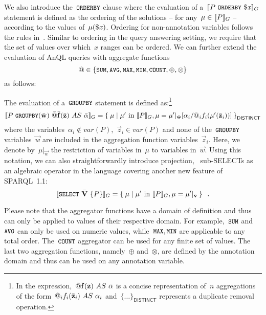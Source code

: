 \nd We also introduce the~$\texttt{{\small ORDERBY}}$ clause where the evaluation of
a~$\eval{P\ \keyword{ORDERBY}\ \var{x}}_{G}$ statement is defined as the ordering of the solutions -- for any~$\mu \in
[\![ P ]\!]_G$ -- according to the values of~$\mu(\$\mathit{x})$. Ordering for non-annotation variables follows the rules
in~\citet[Section~9.1]{PrudhommeauxSeaborne:2008aa}.
%
Similar to ordering in the query answering setting, we require that the set of values over which~$x$ ranges can be
ordered.
%
We can further extend the evaluation of AnQL queries with aggregate functions
\[
@ \in \{\texttt{{\small SUM}},\texttt{{\small AVG}}, \texttt{{\small MAX}}, \texttt{{\small MIN}}, \texttt{{\small COUNT}}, \oplus, \otimes\}
\]%
\vspace{-\belowdisplayskip}%
\nd as follows:
%
\begin{definition}
  \label{def:groupby}
  The evaluation of a~$\texttt{{\small GROUPBY}}$ statement is defined as:\footnote{In the
    expression,~$\vec{\aggr}\vec{f}(\vec{z})\ AS\ \vec{\alpha}$ is a concise representation of~$n$ aggregations of the
    form~$@_{i} f_{i}(\bar{\mathbf z}_{i})\ AS\ \alpha_{i}$ and~$\{\ldots\}_{\mathsf{DISTINCT}}$ represents a duplicate
    removal operation.}
  \[
  \eval{P\ \keyword{GROUPBY}(\vec{w})\ \vec{\aggr}\vec{f}(\vec{z})\ AS\ \vec{\alpha}}_{G} = \set{ \mu \mid \mu'\mbox{ in
    }\eval{P}_{G}, \mu = \mu'|_{\vec{w}}[\alpha_i/\aggr_{i}{}f_i(\mu'(\vec{z}_{i}))] }_{\mathsf{DISTINCT}}
  \]
  \nd where the variables~$\alpha_i \not\in var(P)$,~$\vec{z}_i \in var(P)$ and none of the~$\texttt{{\small GROUPBY}}$
  variables~$\vec{w}$ are included in the aggregation function variables~$\vec{z}_i$.  Here, we denote
  by~$\mu|_{\vec{w}}$ the restriction of variables in~$\mu$ to variables in~$\vec{w}$. Using this notation, we can also
  straightforwardly introduce projection, \ie~sub-SELECTs as an algebraic operator in the language covering another new
  feature of SPARQL~1.1: 
  \[
  [\![ \texttt{{\small SELECT}}\ \bar{\mathbf V}\ \{ P \}  ]\!]_{G} = \left\{\: \mu \mid \mu'\mbox{ in }[\![ P ]\!]_{G}, \mu = \mu'|_{\bar{\mathbf v}} \:\right\} \enspace .
  \]
\end{definition}

Please note that the aggregator functions have a domain of definition and thus can only be applied to values of their
respective domain.  For example,~$\texttt{{\small SUM}}$ and~$\texttt{{\small AVG}}$ can only be used on numeric values,
while~$\texttt{{\small MAX}}, \texttt{{\small MIN}}$ are applicable to any total order.
% 
The~$\texttt{{\small COUNT}}$ aggregator can be used for any finite set of values. The last two aggregation functions,
namely~$\oplus$ and~$\otimes$, are defined by the annotation domain and thus can be used on any annotation variable.


